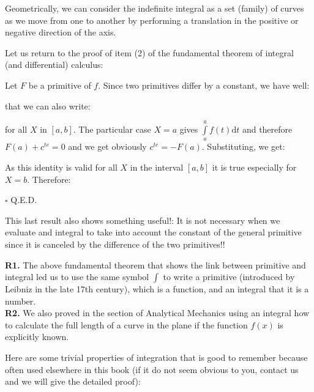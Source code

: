 	Geometrically, we can consider the indefinite integral as a set (family) of curves as we move from one to another by performing a translation in the positive or negative direction of the axis.
	
	Let us return to the proof of item (2) of the fundamental theorem of integral (and differential) calculus:
	\begin{dem}
	Let $F$ be a primitive of $f$. Since two primitives differ by a constant, we have well:
	
	that we can also write:
	
	for all $X$ in $[a, b]$. The particular case $X=a$ gives $\int\limits_a^a f(t)\mathrm{d}t$ and therefore $F(a)+c^{te}=0$ and we get obviously $c^{te}=-F(a)$. Substituting, we get:
	
	As this identity is valid for all $X$ in the interval $[a,b]$ it is true especially for $X=b$. Therefore:
	
	\begin{flushright}
		$\square$  Q.E.D.
	\end{flushright}
	\end{dem}
	This last result also shows something useful!: It is not necessary when we evaluate and integral to take into account the constant of the general primitive since it is canceled by the difference of the two primitives!!
	\begin{tcolorbox}[title=Remarks,colframe=black,arc=10pt]
	\textbf{R1.} The above fundamental theorem that shows the link between primitive and integral led us to use the same symbol $\int$ to write a primitive (introduced by Leibniz in the late 17th century), which is a function, and an integral that it is a number.\\
	
	\textbf{R2.} We also proved in the section of Analytical Mechanics using an integral how to calculate the full length of a curve in the plane if the function $f(x)$ is explicitly known.
	\end{tcolorbox}
	Here are some trivial properties of integration that is good to remember because often used elsewhere in this book (if it do not seem obvious to you, contact us and we will give the detailed proof):
